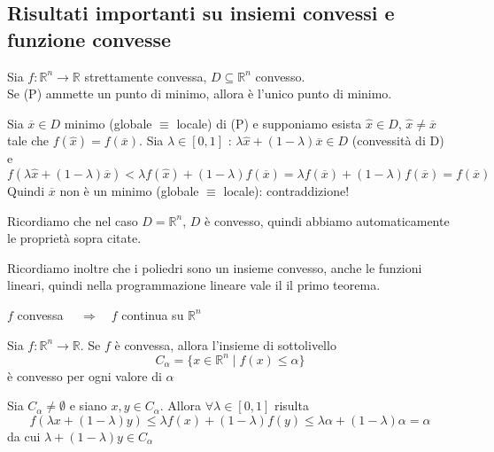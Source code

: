 \subsection{Risultati importanti su insiemi convessi
e funzione convesse}
\begin{theo}
 Sia $f: \mathbb{R}^n \rightarrow \mathbb{R}$ strettamente convessa,
$D \subseteq \mathbb{R}^n$ convesso. \\ Se (P) ammette un punto di
minimo, allora è l'unico punto di minimo.
\end{theo}

\begin{thproof}
 Sia $\overline{x} \in D$ minimo (globale $\equiv$ locale) di 
(P) e supponiamo esista $\hat{x} \in D$, $\hat{x} \neq \overline{x}$
 tale che $f(\hat{x}) = f(\overline{x})$. Sia $\lambda \in [0,1]
$ : $\lambda \hat{x} + (1-\lambda) \overline{x} \in D$
 (convessit\`a di D) e 
$$ f(\lambda \hat{x} + (1-\lambda)\overline{x}) < 
 \lambda f(\hat{x}) + (1-\lambda) f(\overline{x}) = 
 \lambda f(\overline{x}) + (1-\lambda)f(\overline{x}) =
  f(\overline{x})$$
  Quindi $\overline{x}$ non \`e un minimo 
 (globale $\equiv$ locale): contraddizione!
 \end{thproof}

\begin{notes}
 Ricordiamo che nel caso $D=\mathbb{R}^{n}$, $D$ è convesso, quindi abbiamo
automaticamente le proprietà sopra citate.
\end{notes}

\begin{notes}
Ricordiamo inoltre che i poliedri sono un insieme convesso, anche le
funzioni lineari, quindi nella programmazione lineare vale il il primo
teorema.
\end{notes}

\begin{property}
 $f$ convessa $\quad \Longrightarrow \quad f $ continua su
$\mathbb{R}^{n} $
\end{property}

\begin{property}
Sia $f: \mathbb{R}^{n} \rightarrow \mathbb{R}$.  Se $f$ è 
convessa, allora l'insieme di sottolivello
$$ C_{\alpha} = \{  x \in \mathbb{R}^{n} \; | \;  f(x) \leq \alpha \}$$
è convesso per ogni valore di $\alpha$
\end{property}

\begin{thproof}
Sia $C_\alpha \neq \emptyset$ e siano $x,y \in C_{\alpha}$. 
Allora $\forall \lambda \in [0,1]$ risulta
$$ f(\lambda x + (1-\lambda)y) \leq
 \lambda f(x) + (1-\lambda) f(y) \leq \lambda \alpha
 + (1-\lambda) \alpha = \alpha$$
da cui $\lambda + (1-\lambda)y \in C_{\alpha}$
\end{thproof}

